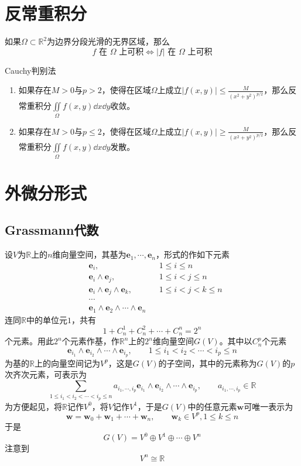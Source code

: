 \documentclass[lang = cn, scheme = chinese, thmcnt = section]{elegantbook}
\newcommand{\R}{\mathbb{R}}            %
\newcommand{\sub}{\subset}             %
\newcommand{\bs}{\boldsymbol}          %
\newcommand{\dis}{\displaystyle}
\begin{document}
\section{反常重积分}

\begin{theorem}
	如果$\Omega\sub\R^2$为边界分段光滑的无界区域，那么
	$$
	f\text{ 在 }\Omega\text{ 上可积}
	\iff 
	|f|\text{ 在 }\Omega\text{ 上可积}
	$$
\end{theorem}

\begin{theorem}{Cauchy判别法}
	\begin{enumerate}
		\item 如果存在$M>0$与$p>2$，使得在区域$\Omega$上成立$\dis |f(x,y)|\le\frac{M}{(x^2+y^2)^{p/2}}$，那么反常重积分$\dis \iint\limits_{\Omega}f(x,y)\dd x \dd y$收敛。
		\item 如果存在$M>0$与$p\le 2$，使得在区域$\Omega$上成立$\dis |f(x,y)|\ge\frac{M}{(x^2+y^2)^{p/2}}$，那么反常重积分$\dis \iint\limits_{\Omega}f(x,y)\dd x \dd y$发散。
	\end{enumerate}
\end{theorem}

\section{外微分形式}

\subsection{Grassmann代数}

设$V$为$\R$上的$n$维向量空间，其基为$\bs{e}_1,\cdots,\bs{e}_n$，形式的作如下元素
\begin{align*}
	& \bs{e}_i,&& 1\le i\le n\\
	& \bs{e}_i\wedge \bs{e}_j,&& 1\le i <j \le n\\
	& \bs{e}_i\wedge \bs{e}_j\wedge \bs{e}_k,&& 1\le i <j<k \le n\\
	& \cdots\\
	& \bs{e}_1\wedge \bs{e}_2\wedge\cdots \wedge \bs{e}_n
\end{align*}
连同$\R$中的单位元$1$，共有%
$$
1+C_n^1+C_n^2+\cdots+C_n^n=2^n
$$
个元素。用此$2^n$个元素作基，作$\R^n$上的$2^n$维向量空间$G(V)$。其中以$C_n^p$个元素%
$$
\bs{e}_{i_1}\wedge \bs{e}_{i_2}\wedge \cdots\wedge \bs{e}_{i_p},\qquad 1\le i_1<i_2<\cdots<i_p\le n
$$
为基的$\R$上的向量空间记为$V^p$，这是$G(V)$的子空间，其中的元素称为$G(V)$的$p$次齐次元素，可表示为%
$$
\sum_{1\le i_1<i_2<\cdots<i_p\le n}a_{i_1,\cdots,i_p}\bs{e}_{i_1}\wedge \bs{e}_{i_2}\wedge \cdots\wedge \bs{e}_{i_p},\qquad 
a_{i_1,\cdots,i_p}\in\R
$$
为方便起见，将$\R$记作$V^0$，将$V$记作$V^1$，于是$G(V)$中的任意元素$\bs{w}$可唯一表示为%
$$
\bs{w}=\bs{w}_0+\bs{w}_1+\cdots+\bs{w}_n,\qquad 
\bs{w}_k\in V^p,1\le k \le n
$$
于是%
$$
G(V)=V^0\oplus V^1\oplus \cdots\oplus V^n
$$
注意到%
$$
V^n\cong\R
$$
\end{document}
